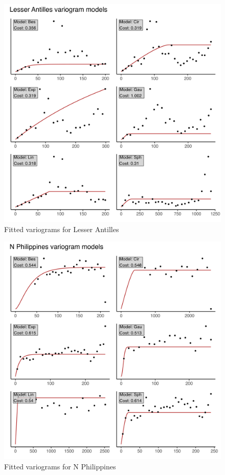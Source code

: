 \begin{figure}
\centering
\includegraphics{assets/figs/chpt3/LesserAntillesVgrms.png}
\caption[Fitted variograms for Lesser Antilles]{Fitted variograms for Lesser Antilles}
\end{figure}

\begin{figure}
\centering
\includegraphics{assets/figs/chpt3/NPhilippinesVgrms.png}
\caption[Fitted variograms for N Philippines]{Fitted variograms for N Philippines}
\end{figure}

